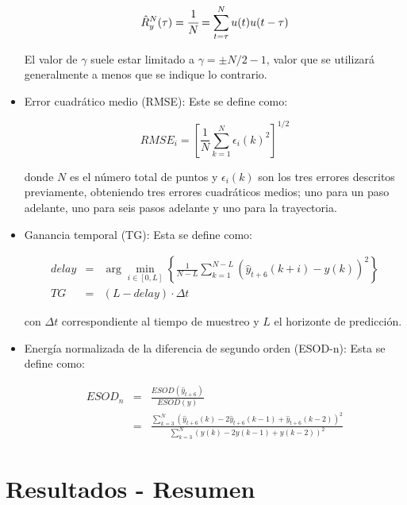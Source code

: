 \begin{itemize}
\begin{equation}
	\hat{R}_y^N(\tau) = \cfrac{1}{N} = \sum_{t = \tau}^{N} u(t)u(t - \tau)
\end{equation}

El valor de $\gamma$ suele estar limitado a $\gamma = \pm N/2 - 1$, valor que se utilizará generalmente a menos que se indique lo contrario.

\item Error cuadrático medio (RMSE): Este se define como:

\begin{equation}
	RMSE_{i} = 
	\left[
	\frac{1}{N}
	\sum_{k=1}^{N}
	\epsilon_{i}(k)^2
	\right]^{1/2}
\end{equation}

donde $N$ es el número total de puntos y $\epsilon_{i}(k)$ son los tres errores descritos previamente, obteniendo tres errores cuadráticos medios; uno para un paso adelante, uno para seis pasos adelante y uno para la trayectoria.

\item Ganancia temporal (TG): Esta se define como:

\begin{eqnarray}
	delay & = & \arg \min _{i \in [0, L]} 
	\left\{
	\frac{1}{N-L} \sum_{k=1}^{N-L} \left(
	\hat{y}_{t+6}(k+i) - y(k)
	\right)^2
	\right\} \\
	TG & = & \left(L - delay\right)\cdot \Delta t
\end{eqnarray}

con $\Delta t$ correspondiente al tiempo de muestreo y $L$ el horizonte de predicción.

\item Energía normalizada de la diferencia de segundo orden (ESOD-n): Esta se define como:

\begin{eqnarray}
	ESOD_n & = & \frac{ESOD(\hat{y}_{t+6})}{ESOD(y)} \\
	& = & 
	\frac{
	\sum_{k=3}^{N} \left(
	\hat{y}_{t+6}(k) - 2 \hat{y}_{t+6}(k - 1) + \hat{y}_{t+6}(k - 2)
	\right)^2
	}
	{
	\sum_{k=3}^{N} \left(
	y(k) - 2 y(k - 1) + y(k - 2)
	\right)^2	
	}
\end{eqnarray}

\end{itemize}


\section{Resultados - Resumen}

